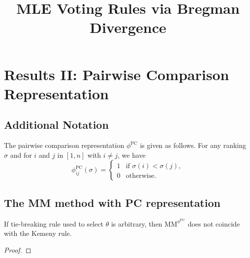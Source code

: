 \documentclass[10pt,letterpaper]{article}
\title{MLE Voting Rules via Bregman Divergence}
\newcommand{\mm}{\text{MM}}
\newcommand{\phipc}{\phi^{\text{PC}}}
\newcommand{\mmphipc}{\mm^{\phipc}}
\newcommand{\that}{\hat{\theta}}
\begin{document}
\maketitle


\section{Results II: Pairwise Comparison Representation}

\subsection{Additional Notation}

The pairwise comparison representation $\phipc$ is given as follows. For any ranking $\sigma$ and for $i$ and $j$ in $[1,n]$ with $i \neq j$, we have
$$
\phipc_{ij}(\sigma) = 
\begin{cases}
1 & \text{if } \sigma(i) < \sigma(j),\\
0 & \text{otherwise.}
\end{cases}
$$

\subsection{The MM method with PC representation}

\begin{observation}
If tie-breaking rule used to select $\that$ is arbitrary, then $\mmphipc$ does not coincide with the Kemeny rule. 
\end{observation}
\begin{proof}

\end{proof}
\end{document}
